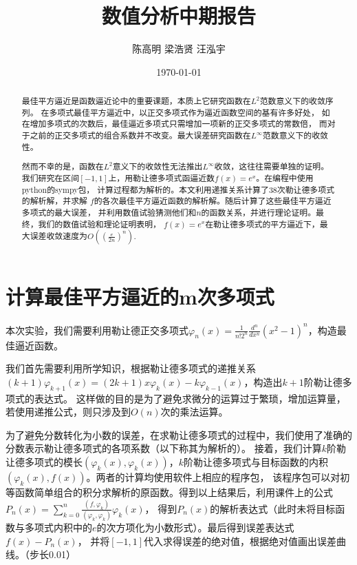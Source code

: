 \documentclass{article}
\title{\heiti 数值分析中期报告}
\author{陈高明 \quad 梁浩贤 \quad 汪泓宇}
\date{\today}
\begin{document}
\newtheorem{theorem}{定理}[section]
\newtheorem{definition}[theorem]{定义}
\newtheorem{lemma}[theorem]{引理}
\newtheorem{corollary}[theorem]{推论}
\newtheorem{example}[theorem]{例}
\newtheorem{proposition}[theorem]{命题}
    \maketitle

    \begin{abstract}
        最佳平方逼近是函数逼近论中的重要课题，本质上它研究函数在$L^2$范数意义下的收敛序列。
        在多项式最佳平方逼近中，以正交多项式作为逼近函数空间的基有许多好处，
        如在增加多项式的次数后，最佳逼近多项式只需增加一项新的正交多项式的常数倍，
        而对于之前的正交多项式的组合系数并不改变。最大误差研究函数在$L^\infty$范数意义下的收敛性。
        
        然而不幸的是，函数在$L^2$意义下的收敛性无法推出$L^\infty$收敛，这往往需要单独的证明。
        我们研究在区间$[-1,1]$上，用勒让德多项式函逼近数$f(x)=e^x$。在编程中使用python的sympy包，
        计算过程都为解析的。本文利用递推关系计算了38次勒让德多项式的解析解，并求解
        $f$的各次最佳平方逼近函数的解析解。随后计算了这些最佳平方逼近多项式的最大误差，
        并利用数值试验猜测他们和$n$的函数关系，并进行理论证明。最终，我们的数值试验和理论证明表明，
        $f(x)=e^x$在勒让德多项式的平方逼近下，最大误差收敛速度为$O((\frac{e}{2n})^n).$ \\
    \end{abstract}
    
    \section{计算最佳平方逼近的m次多项式}
    本次实验，我们需要利用勒让德正交多项式$\varphi_n(x)=\frac{1}{n!2^n}\frac{d^n}{dx^n}(x^2-1)^n$，构造最佳逼近函数。
    \par
    我们首先需要利用所学知识，根据勒让德多项式的递推关系$(k+1)\varphi_{k+1}(x)=(2k+1)x\varphi_k(x)-k\varphi_{k-1}(x)$，构造出$k+1$阶勒让德多项式的表达式。
    这样做的目的是为了避免求微分的运算过于繁琐，增加运算量，若使用递推公式，则只涉及到$O(n)$次的乘法运算。
    \par
    为了避免分数转化为小数的误差，在求勒让德多项式的过程中，我们使用了准确的分数表示勒让德多项式的各项系数（以下称其为解析的）。
    接着，我们计算$k$阶勒让德多项式的模长$(\varphi_k(x),\varphi_k(x))$，$k$阶勒让德多项式与目标函数的内积$(\varphi_k(x),f(x))$。两者的计算均使用软件上相应的程序包，
    该程序包可以对初等函数简单组合的积分求解析的原函数。得到以上结果后，利用课件上的公式$P_n(x)=\sum_{k=0}^{n}\frac{(f,\varphi_k)}{(\varphi_k,\varphi_k)}\varphi_k(x)$，
    得到$P_n(x)$的解析表达式（此时未将目标函数与多项式内积中的$e$的次方项化为小数形式）。最后得到误差表达式$f(x)-P_n(x)$，
    并将$[-1,1]$代入求得误差的绝对值，根据绝对值画出误差曲线。（步长0.01）
\end{document}
